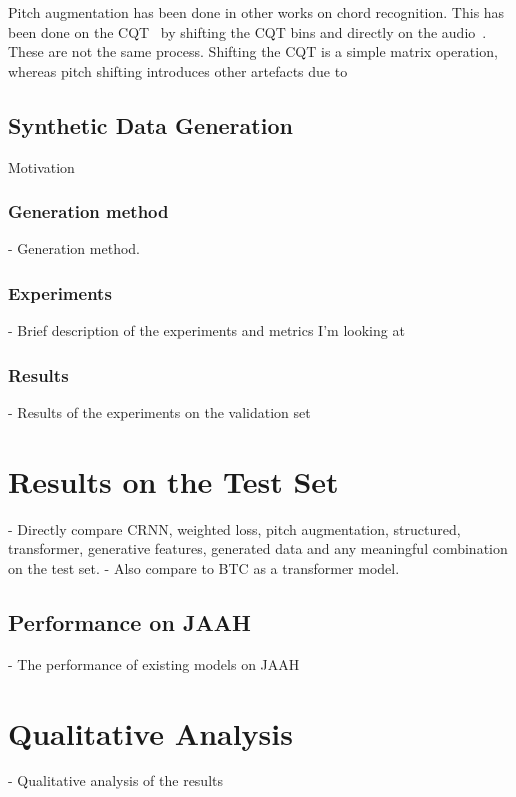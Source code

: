 Pitch augmentation has been done in other works on chord recognition. This has been done on the CQT~\citep{ACRLargeVocab1} by shifting the CQT bins and directly on the audio~\citep{BTC,StructuredTraining}. These are not the same process. Shifting the CQT is a simple matrix operation, whereas pitch shifting introduces other artefacts due to 


\subsection{Synthetic Data Generation}\label{chap:synthetic_data}

Motivation

\subsubsection{Generation method} 
- Generation method. 
\subsubsection{Experiments}
- Brief description of the experiments and metrics I'm looking at
\subsubsection{Results}
- Results of the experiments on the validation set

\section{Results on the Test Set}

- Directly compare CRNN, weighted loss, pitch augmentation, structured, transformer, generative features, generated data and any meaningful combination on the test set.
- Also compare to BTC as a transformer model.

\subsection{Performance on JAAH}
- The performance of existing models on JAAH


\section{Qualitative Analysis}
- Qualitative analysis of the results